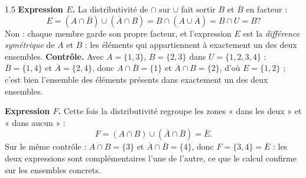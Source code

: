 \begin{corrige}{1.5}
\textbf{Expression $E$.} La distributivité de $\cap$ sur $\cup$ fait sortir $B$ et $\overline{B}$ en facteur :
\[
E = (A \cap \overline{B}) \cup (\overline{A} \cap B) = B \cap (A \cup \overline{A}) = B \cap U = B ?
\]
Non : chaque membre garde son propre facteur, et l'expression $E$ est la \emph{différence symétrique} de $A$ et $B$ : les éléments qui appartiennent à exactement un des deux ensembles. \textbf{Contrôle.} Avec $A = \{1, 3\}$, $B = \{2, 3\}$ dans $U = \{1, 2, 3, 4\}$ : $\overline{B} = \{1, 4\}$ et $\overline{A} = \{2, 4\}$, donc $A \cap \overline{B} = \{1\}$ et $\overline{A} \cap B = \{2\}$, d'où $E = \{1, 2\}$ ; c'est bien l'ensemble des éléments présents dans exactement un des deux ensembles.
\par\smallskip
\textbf{Expression $F$.} Cette fois la distributivité regroupe les zones « dans les deux » et « dans aucun » :
\[
F = (A \cap B) \cup (\overline{A} \cap \overline{B}) = \overline{E} .
\]
Sur le même contrôle : $A \cap B = \{3\}$ et $\overline{A} \cap \overline{B} = \{4\}$, donc $F = \{3, 4\} = \overline{E}$ : les deux expressions sont complémentaires l'une de l'autre, ce que le calcul confirme sur les ensembles concrets.
\end{corrige}
